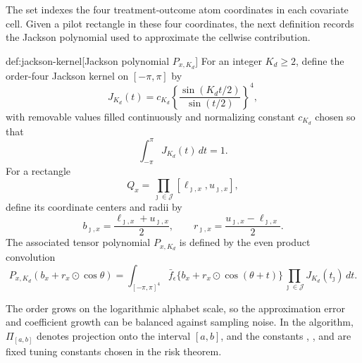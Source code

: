 The set  indexes the four treatment-outcome atom coordinates in each covariate cell. Given a pilot rectangle in these four coordinates, the next definition records the Jackson polynomial used to approximate the cellwise contribution.

\begin{definitionv}{def:jackson-kernel}[Jackson polynomial \(P_{x,K_d}\)]
For an integer \(K_d\ge 2\), define the order-four Jackson kernel on \([-\pi,\pi]\) by
\[
J_{K_d}(t)
=
c_{K_d}
\left\{
\frac{\sin(K_dt/2)}{\sin(t/2)}
\right\}^{4},
\]
with removable values filled continuously and normalizing constant \(c_{K_d}\) chosen so that
\[
\int_{-\pi}^{\pi} J_{K_d}(t)\,dt=1.
\]
For a rectangle
\[
Q_x
=
\prod_{\jmath\in\mathcal J}
[\ell_{\jmath,x},u_{\jmath,x}],
\]
define its coordinate centers and radii by
\[
b_{\jmath,x}
=
\frac{\ell_{\jmath,x}+u_{\jmath,x}}{2},
\qquad
r_{\jmath,x}
=
\frac{u_{\jmath,x}-\ell_{\jmath,x}}{2}.
\]
The associated tensor polynomial \(P_{x,K_d}\) is defined by the even product convolution
\[
P_{x,K_d}(b_x+r_x\odot\cos\theta)
=
\int_{[-\pi,\pi]^4}
\bar f_\epsilon\{b_x+r_x\odot\cos(\theta+t)\}
\prod_{\jmath\in\mathcal J}J_{K_d}(t_{\jmath})\,dt.
\]
\end{definitionv}

The order  grows on the logarithmic alphabet scale, so the approximation error and coefficient growth can be balanced against sampling noise. In the algorithm, \(\Pi_{[a,b]}\) denotes projection onto the interval \([a,b]\), and the constants , , and  are fixed tuning constants chosen in the risk theorem.

